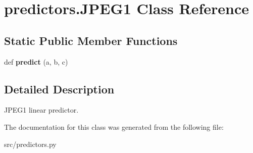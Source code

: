 \hypertarget{classpredictors_1_1JPEG1}{}\section{predictors.\+J\+P\+E\+G1 Class Reference}
\label{classpredictors_1_1JPEG1}
\subsection*{Static Public Member Functions}
\begin{DoxyCompactItemize}
\item 
\mbox{\label{classpredictors_1_1JPEG1_a3c945547c4995e537f6fbc8d89374644}} 
def {\bfseries predict} (a, b, c)
\end{DoxyCompactItemize}


\subsection{Detailed Description}
\begin{DoxyVerb}JPEG1 linear predictor.
\end{DoxyVerb}
 

The documentation for this class was generated from the following file\+:\begin{DoxyCompactItemize}
\item 
src/predictors.\+py\end{DoxyCompactItemize}
